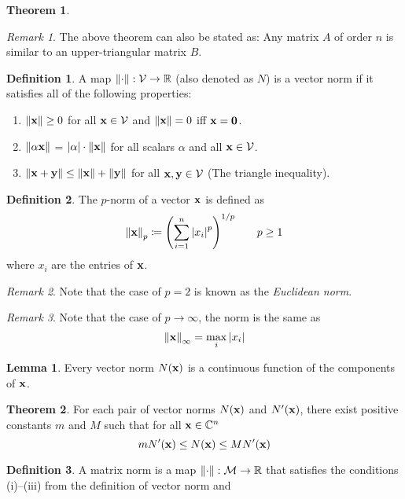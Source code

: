 \documentclass[11pt,letterpaper]{article}
\numberwithin{figure}{section} %
\newcommand{\Reals}{\mathbb{R}}
\newcommand{\Complex}{\mathbb{C}}
\newcommand{\keyword}[1]{\colorbox{cyan!20!}{#1}}
\theoremstyle{definition}
\newtheorem{theorem}{Theorem}[subsection]
\theoremstyle{definition}
\theoremstyle{definition}
\newtheorem{lemma}{Lemma}[subsection]
\theoremstyle{definition}
\newtheorem{definition}{Definition}[subsection]
\theoremstyle{definition}
\theoremstyle{remark}
\newtheorem*{remark}{Remark}
\theoremstyle{remark}
\theoremstyle{definition}
\theoremstyle{remark}
\theoremstyle{remark}
\begin{document}
\begin{multicols*}{3}
\begin{theorem}
\end{theorem}
\begin{remark}
	The above theorem can also be stated as: Any matrix $A$ of order $n$ is
	similar to an upper-triangular matrix $B$.
\end{remark}
\begin{definition}
	A map $\norm{\cdot} : \mathcal{V} \to \Reals$ (also denoted as $N$) is a
	\keyword{vector norm} if it satisfies all of the following properties:
	\begin{enumerate}[label={(\roman*)}]
		\item $\norm{\vb{x}} \geq 0$ for all $\vb{x} \in \mathcal{V}$ and
			$\norm{\vb{x}} = 0$ iff $\vb{x} = \vb{0}$.
		\item $\norm{\alpha \vb{x}}$ = $\abs{\alpha}\cdot \norm{\vb{x}}$ for all 
			scalars $\alpha$ and all $\vb{x} \in \mathcal{V}$.
		\item $\norm{\vb{x} + \vb{y}} \leq \norm{\vb{x}} + \norm{\vb{y}}$ for all
			$\vb{x},\vb{y} \in \mathcal{V}$ (The triangle inequality).
	\end{enumerate}
\end{definition}
\begin{definition}
	The \keyword{$p$-norm} of a vector $\vb{x}$ is defined as 
	\[
		\norm{\vb{x}}_p \coloneqq \pqty{\sum_{i=1}^n \abs{x_i}^p}^{1/p} \qquad p \geq 1
	\]
	where $x_i$ are the entries of $\vb{x}$.
\end{definition}
\begin{remark}
	Note that the case of $p=2$ is known as the \textit{Euclidean norm}.
\end{remark}
\begin{remark}
	Note that the case of $p\to\infty$, the norm is the same as
	\[
		\norm{\vb{x}}_\infty = \max_i \abs{x_i}
	\]
\end{remark}
\begin{lemma}\label{lem:norm_cont_func}
	Every vector norm $N(\vb{x})$ is a continuous function of the components of
	$\vb{x}$.
\end{lemma}
\begin{theorem}\label{thm:norm_eqiv}
	For each pair of vector norms $N(\vb{x})$ and $N'(\vb{x})$, there exist
	positive constants $m$ and $M$ such that for all $\vb{x} \in \Complex^n$
	\[
		mN'(\vb{x}) \leq N(\vb{x}) \leq MN'(\vb{x})
	\]
\end{theorem}
\begin{definition}
	A \keyword{matrix norm} is a map $\norm{\cdot} : \mathcal{M} \to \Reals$ that
	satisfies the conditions (i)--(iii) from the definition of vector norm and

\end{definition}
\end{multicols*}
\end{document}
